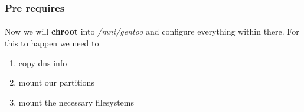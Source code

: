 \documentclass[10pt,a4paper]{article}
\begin{document}
            \subsubsection{Pre requires}

                \paragraph{} Now we will \textbf{chroot} into \textit{/mnt/gentoo} and configure everything within there. For this to happen we need to
                \begin{enumerate}
                    \item copy dns info
                    \item mount our partitions
                    \item mount the necessary filesystems
                \end{enumerate}
\end{document}

